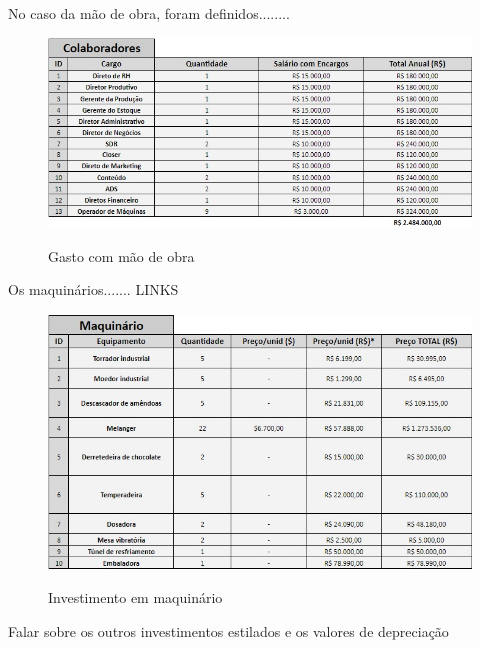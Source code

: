 \documentclass[
	12pt,				%
	openright,			%
	oneside,			%
	a4paper,			%
	english,			%
	french,				%
	spanish,			%
	brazil				%
	]{abntex2}
\begin{document}
No caso da mão de obra, foram definidos........

\begin{figure}[H]
\begin{center}
\caption{Gasto com mão de obra}
\includegraphics[scale=0.6]{4.jpeg} 
\label{-}
\end{center}
\end{figure}


Os maquinários....... LINKS

\begin{figure}[H]
\begin{center}
\caption{Investimento em maquinário}
\includegraphics[scale=0.6]{5.jpeg} 
\label{-}
\end{center}
\end{figure}

Falar sobre os outros investimentos estilados e os valores de depreciação
\end{document}
